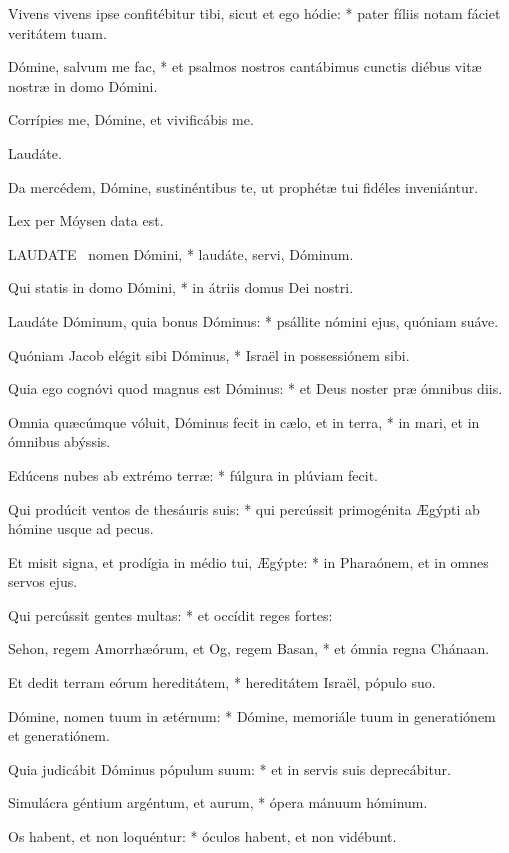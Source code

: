 Vivens vivens ipse confitébitur tibi, sicut et ego hódie: * pater fíliis notam fáciet veritátem tuam.

Dómine, salvum me fac, * et psalmos nostros cantábimus cunctis diébus vitæ nostræ in domo Dómini.

 Corrípies me, Dómine, et vivificábis me.

 Laudáte. \textdagger

  Da mercédem, Dómine, sustinéntibus te, ut prophétæ tui fidéles inveniántur.

 Lex per Móysen data est.


\lettrine[lines=2]{L}{AUDATE} \textdagger\ nomen Dómini, * laudáte, servi, Dóminum.

Qui statis in domo Dómini, * in átriis domus Dei nostri.

Laudáte Dóminum, quia bonus Dóminus: * psállite nómini ejus, quóniam suáve.

Quóniam Jacob elégit sibi Dóminus, * Israël in possessiónem sibi.

Quia ego cognóvi quod magnus est Dóminus: * et Deus noster præ ómnibus diis.

Omnia quæcúmque vóluit, Dóminus fecit in cælo, et in terra, * in mari, et in ómnibus abýssis.

Edúcens nubes ab extrémo terræ: * fúlgura in plúviam fecit.

Qui prodúcit ventos de thesáuris suis: * qui percússit primogénita Ægýpti ab hómine usque ad pecus.

Et misit signa, et prodígia in médio tui, Ægýpte: * in Pharaónem, et in omnes servos ejus.

Qui percússit gentes multas: * et occídit reges fortes:

Sehon, regem Amorrhæórum, et Og, regem Basan, * et ómnia regna Chánaan.

Et dedit terram eórum hereditátem, * hereditátem Israël, pópulo suo.

Dómine, nomen tuum in ætérnum: * Dómine, memoriále tuum in generatiónem et generatiónem.

Quia judicábit Dóminus pópulum suum: * et in servis suis deprecábitur.

Simulácra géntium argéntum, et aurum, * ópera mánuum hóminum.

Os habent, et non loquéntur: * óculos habent, et non vidébunt.

